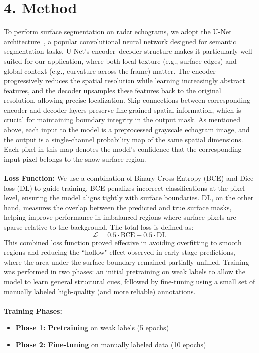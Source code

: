 \documentclass[11pt,oneside,openany]{article}
\begin{document}
\section*{4. Method}
To perform surface segmentation on radar echograms, we adopt the U-Net architecture~\cite{1}, a popular convolutional neural network designed for semantic segmentation tasks. U-Net’s encoder–decoder structure makes it particularly well-suited for our application, where both local texture (e.g., surface edges) and global context (e.g., curvature across the frame) matter. The encoder progressively reduces the spatial resolution while learning increasingly abstract features, and the decoder upsamples these features back to the original resolution, allowing precise localization. Skip connections between corresponding encoder and decoder layers preserve fine-grained spatial information, which is crucial for maintaining boundary integrity in the output mask. As mentioned above, each input to the model is a preprocessed grayscale echogram image, and the output is a single-channel probability map of the same spatial dimensions. Each pixel in this map denotes the model's confidence that the corresponding input pixel belongs to the snow surface region.\\\\
\textbf{Loss Function:} We use a combination of Binary Cross Entropy (BCE) and Dice loss (DL) to guide training. BCE penalizes incorrect classifications at the pixel level, ensuring the model aligns tightly with surface boundaries. DL, on the other hand, measures the overlap between the predicted and true surface masks, helping improve performance in imbalanced regions where surface pixels are sparse relative to the background. The total loss is defined as:
\[
\mathcal{L} = 0.5 \cdot \text{BCE} + 0.5 \cdot \text{DL}
\]
This combined loss function proved effective in avoiding overfitting to smooth regions and reducing the ``hollow" effect observed in early-stage predictions, where the area under the surface boundary remained partially unfilled. Training was performed in two phases: an initial pretraining on weak labels to allow the model to learn general structural cues, followed by fine-tuning using a small set of manually labeled high-quality (and more reliable) annotations.\\\\
\textbf{Training Phases:}
\begin{itemize}[nosep]
  \item \textbf{Phase 1: Pretraining} on weak labels (5 epochs)
  \item \textbf{Phase 2: Fine-tuning} on manually labeled data (10 epochs)
\end{itemize}
\end{document}
